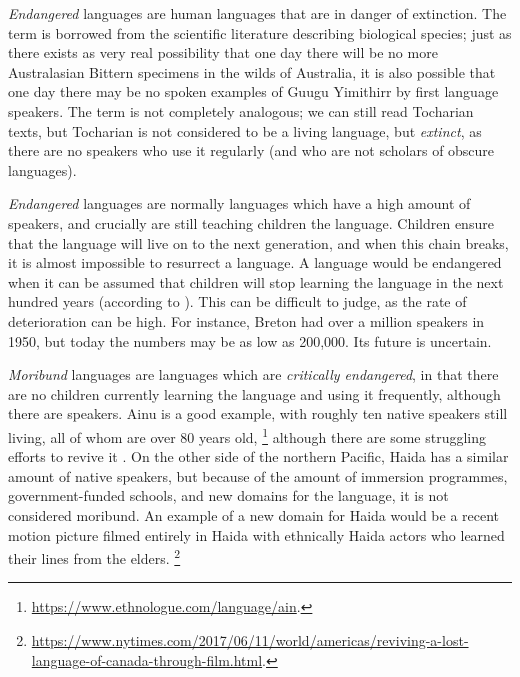 \emph{Endangered} languages are human languages that are in danger of extinction. The term is borrowed from the scientific literature describing biological species; just as there exists as very real possibility that one day there will be no more Australasian Bittern specimens in the wilds of Australia, it is also possible that one day there may be no spoken examples of Guugu Yimithirr by first language speakers. The term is not completely analogous; we can still read Tocharian texts, but Tocharian is not considered to be a living language, but \textit{extinct}, as there are no speakers who use it regularly (and who are not scholars of obscure languages).

{\it Endangered} languages are normally languages which have a high amount of speakers, and crucially are still teaching children the language. Children ensure that the language will live on to the next generation, and when this chain breaks, it is almost impossible to resurrect a language. A language would be endangered when it can be assumed that children will stop learning the language in the next hundred years (according to \citet{krauss92}). This can be difficult to judge, as the rate of deterioration can be high. For instance, Breton had over a million speakers in 1950, but today the numbers may be as low as 200,000. Its future is uncertain.

\emph{Moribund} languages are languages which are {\it critically endangered}, in that there are no children currently learning the language and using it frequently, although there are speakers. Ainu is a good example, with roughly ten native speakers still living, all of whom are over 80 years old, \footnote{\href{https://www.ethnologue.com/language/ain}{https://www.ethnologue.com/language/ain}. } although there are some struggling efforts to revive it \citep{hanks2017policy}. On the other side of the northern Pacific, Haida has a similar amount of native speakers, but because of the amount of immersion programmes, government-funded schools, and new domains for the language, it is not considered moribund. An example of a new domain for Haida would be a recent motion picture filmed entirely in Haida with ethnically Haida actors who learned their lines from the elders. \footnote{\href{https://www.nytimes.com/2017/06/11/world/americas/reviving-a-lost-language-of-canada-through-film.html}{https://www.nytimes.com/2017/06/11/world/americas/reviving-a-lost-language-of-canada-through-film.html}. }

